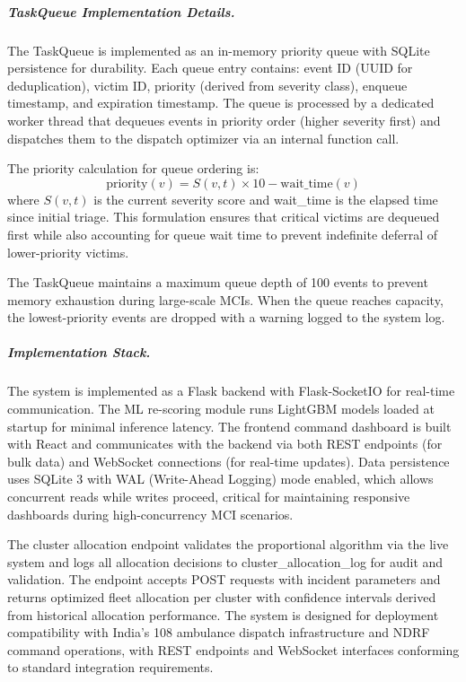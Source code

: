 \documentclass[conference]{IEEEtran}
\begin{document}
\subparagraph{TaskQueue Implementation Details.}
The TaskQueue is implemented as an in-memory priority queue with SQLite persistence for durability. Each queue entry contains: event ID (UUID for deduplication), victim ID, priority (derived from severity class), enqueue timestamp, and expiration timestamp. The queue is processed by a dedicated worker thread that dequeues events in priority order (higher severity first) and dispatches them to the dispatch optimizer via an internal function call.

The priority calculation for queue ordering is:
\begin{equation}
\text{priority}(v) = S(v,t) \times 10 - \text{wait\_time}(v)
\end{equation}
where $S(v,t)$ is the current severity score and wait\_time is the elapsed time since initial triage. This formulation ensures that critical victims are dequeued first while also accounting for queue wait time to prevent indefinite deferral of lower-priority victims.

The TaskQueue maintains a maximum queue depth of 100 events to prevent memory exhaustion during large-scale MCIs. When the queue reaches capacity, the lowest-priority events are dropped with a warning logged to the system log.

\subparagraph{Implementation Stack.}
The system is implemented as a Flask backend with Flask-SocketIO for real-time communication. The ML re-scoring module runs LightGBM models loaded at startup for minimal inference latency. The frontend command dashboard is built with React and communicates with the backend via both REST endpoints (for bulk data) and WebSocket connections (for real-time updates). Data persistence uses SQLite 3 with WAL (Write-Ahead Logging) mode enabled, which allows concurrent reads while writes proceed, critical for maintaining responsive dashboards during high-concurrency MCI scenarios.

The cluster allocation endpoint validates the proportional algorithm via the live system and logs all allocation decisions to cluster\_allocation\_log for audit and validation. The endpoint accepts POST requests with incident parameters and returns optimized fleet allocation per cluster with confidence intervals derived from historical allocation performance. The system is designed for deployment compatibility with India's 108 ambulance dispatch infrastructure and NDRF command operations, with REST endpoints and WebSocket interfaces conforming to standard integration requirements.
\end{document}
